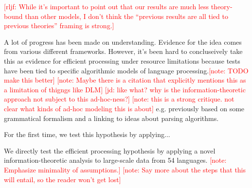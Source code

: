 \documentclass[12pt]{article}
\newcommand{\jd}[1]{\textcolor{Red}{[jd: #1]}}
\newcommand{\note}[1]{\textcolor{Red}{[note: #1]}}
\newcommand{\rljf}[1]{\textcolor{Red}{[rljf: #1]}}
\begin{document}
\rljf{While it's important to point out that our results are much less theory-bound than other models, I don't think the ``previous results are all tied to previous theories'' framing is strong.}


A lot of progress has been made on understanding. Evidence for the idea comes from various different frameworks.
However, it's been hard to concluseively take this as evidence for efficient processing under resource limitations because tests have been tied to specific algorithmic models of language processing.\note{TODO make this better}
\note{Maybe there is a citation that explicitly mentions this as a limitation of  thigngs like DLM}
\jd{like what? why is the information-theoretic approach not subject to this ad-hoc-ness?}
\note{this is a strong critique. not clear what kinds of ad-hoc modeling this is about}
e.g. previously based on some grammatical formalism and a linking to ideas about parsing algorithms.

For the first time, we test this hypothesis by applying...

We directly test the efficient processing hypothesis by applying a novel information-theoretic analysis to large-scale data from 54 languages.
\note{Emphasize minimality of assumptions.}
\note{Say more about the steps that this will entail, so the reader won't get lost}




\end{document}

